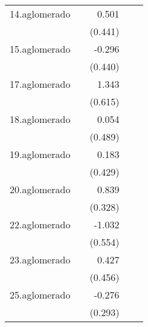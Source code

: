 {\begin{longtable}{l*{4}{D{.}{.}{-1}}}
\addlinespace
14.aglomerado&                     &       0.501         &                     &                     \\
            &                     &     (0.441)         &                     &                     \\
\addlinespace
15.aglomerado&                     &      -0.296         &                     &                     \\
            &                     &     (0.440)         &                     &                     \\
\addlinespace
17.aglomerado&                     &       1.343\sym{*}  &                     &                     \\
            &                     &     (0.615)         &                     &                     \\
\addlinespace
18.aglomerado&                     &       0.054         &                     &                     \\
            &                     &     (0.489)         &                     &                     \\
\addlinespace
19.aglomerado&                     &       0.183         &                     &                     \\
            &                     &     (0.429)         &                     &                     \\
\addlinespace
20.aglomerado&                     &       0.839\sym{*}  &                     &                     \\
            &                     &     (0.328)         &                     &                     \\
\addlinespace
22.aglomerado&                     &      -1.032         &                     &                     \\
            &                     &     (0.554)         &                     &                     \\
\addlinespace
23.aglomerado&                     &       0.427         &                     &                     \\
            &                     &     (0.456)         &                     &                     \\
\addlinespace
25.aglomerado&                     &      -0.276         &                     &                     \\
            &                     &     (0.293)         &                     &                     \\

\end{longtable}}
